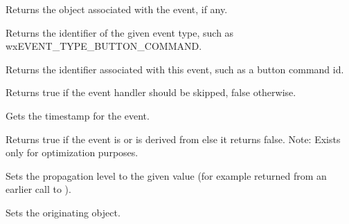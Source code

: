 \label{wxeventgeteventobject}


Returns the object associated with the
event, if any.

\label{wxeventgeteventtype}


Returns the identifier of the given event type,
such as wxEVENT\_TYPE\_BUTTON\_COMMAND.

\label{wxeventgetid}


Returns the identifier associated with this event, such as a button command id.

\label{wxeventgetskipped}


Returns true if the event handler should be skipped, false otherwise.

\label{wxeventgettimestamp}


Gets the timestamp for the event.

\label{wxeventiscommandevent}


Returns true if the event is or is derived from
 else it returns false.
Note: Exists only for optimization purposes.


\label{wxeventresumepropagation}


Sets the propagation level to the given value (for example returned from an
earlier call to ).


\label{wxeventseteventobject}


Sets the originating object.

\label{wxeventseteventtype}

